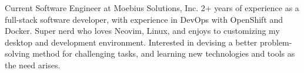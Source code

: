 

\begin{cvparagraph}

	Current Software Engineer at Moebius Solutions, Inc. 2+ years of experience as a full-stack software developer, with experience in DevOps with OpenShift and Docker. Super nerd who loves Neovim, Linux, and enjoys to customizing my desktop and development environment. Interested in devising a better problem-solving method for challenging tasks, and learning new technologies and tools as the need arises.
\end{cvparagraph}
